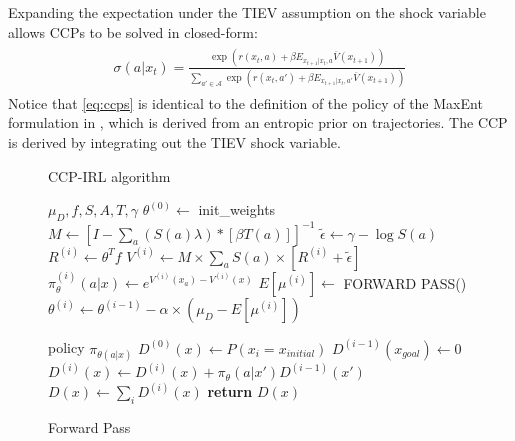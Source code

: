 \documentclass{article}
\begin{document}
Expanding the expectation under the TIEV assumption on the shock variable allows CCPs to be solved in closed-form:
\begin{align} \label{eq:ccps}
\begin{split}
\sigma(a|x_t)=\frac{\exp\left(r(x_t,a)+\beta E_{x_{t+1}|x_t,a} \overline{V}(x_{t+1})\right)}{\sum_{a'\in\mathcal{A}} \exp\left(r(x_t,a')+\beta E_{x_{t+1}|x_t,a'} \overline{V}(x_{t+1})\right)}
\end{split}
\end{align}
Notice that \eqref{eq:ccps} is identical to the definition of the policy of the MaxEnt formulation in \cite{ziebart_phd}, which is derived from an entropic prior on trajectories. The CCP is derived by integrating out the TIEV shock variable. 


\begin{figure}[ht]
\begin{minipage}[t]{0.45\textwidth}
  \begin{algorithm}[H]
    \caption{CCP-IRL algorithm} \label{algo:ccp_irl_algorithm}
    \begin{algorithmic}[1]
         $\mu_D,f, S, A, T, \gamma$
        \STATE $\theta^{(0)} \gets$ init\_weights
        \STATE $M \gets \left[I-\sum_{a}(S(a) \lambda) *\left[ \beta T(a)  \right]\right]^{-1}$ 
        \STATE $\tilde{\epsilon} \gets \gamma - \log S(a)$
            \STATE $R^{(i)} \gets \theta^T f$
            \STATE $V^{(i)} \gets M \times \sum_{a}{S(a) \times \left[ R^{(i)} +\tilde{\epsilon}\right]}$
            \STATE $\pi_{\theta}^{(i)}(a|x) \gets e^{V^{(i)}(x_a) - V^{(i)}(x)}$
            \STATE $E[\mu^{(i)}] \gets $ FORWARD PASS()
            \STATE $\theta^{(i)} \gets \theta^{(i-1)} - \alpha \times (\mu_D - E[\mu^{(i)}])$
        \ENDFOR
    \end{algorithmic}
  \end{algorithm}
\end{minipage}%
\qquad
\begin{minipage}[t]{0.45\textwidth}
  \begin{algorithm}[H]
    \caption{Forward Pass} \label{algo:forward_pass_algorithm}
    \begin{algorithmic}[1]
         policy $\pi_{\theta(a|x)}$
        \STATE $D^{(0)}(x) \gets P(x_i = x_{initial})$
            \STATE $D^{(i-1)}(x_{goal}) \gets 0$
            \STATE $D^{(i)}(x) \gets D^{(i)}(x) + \pi_{\theta}(a|x') D^{(i-1)}(x')$
        \ENDFOR
        \STATE $D(x) \gets \sum_{i}D^{(i)}(x)$ 
        \STATE \textbf{return} $D(x)$
    \end{algorithmic}
  \end{algorithm}
\end{minipage}
\end{figure}
\end{document}
